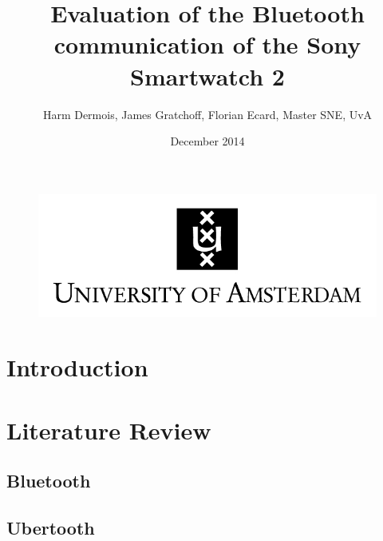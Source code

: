 \documentclass{article}
\begin{document}
 



\begin{figure}[!h]
 	\begin{center}
		\huge \title{Evaluation of the Bluetooth communication of the Sony Smartwatch 2}
		\author{Harm Dermois, James Gratchoff, Florian Ecard,  Master SNE, UvA} 
		\date{December 2014\\}
	\maketitle 
		\includegraphics{uva.jpeg}
		\label{sec:uva}
	\end{center}
\end{figure}

\newpage

\newcommand{\pend}{
 \\ 
\indent}

\begin{abstract}
 
\end{abstract}

\newpage

\tableofcontents

\newpage



\section{Introduction}
\newpage
\section{Literature Review}

	\subsection{Bluetooth}
	\subsection{Ubertooth}
\end{document}
